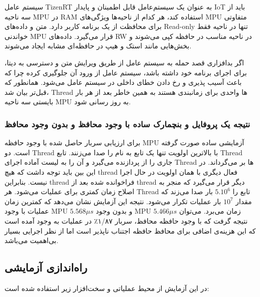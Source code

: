 \documentclass[10pt, a4paper]{article}
\begin{document}
سیستم عامل TizenRT به عنوان یک سیستم‌عامل قابل اطمینان و پایدار IoT باید از سه
ناحیه MPU در RAM استفاده کند، هر کدام از ناحیه‌ها ویژگی‌های MPU متفاوتی برای
محافظت از یک برنامه کاربر دارد. متن و داده‌های Read-only تنها در ناحیه فقط
خواندنی MPU قرار می‌گیرد. داده‌های RW در ناحیه مناسب در حافظه کپی می‌شوند و
بخش‌هایی مانند استک و هیپ در حافظه‌ای مشابه ایجاد می‌شوند.

اگر بد‌افزاری قصد حمله به سیستم عامل از طریق ویرایش متن و دسترسی به دیتا، برای
اجرای برنامه خود داشته باشد، سیستم عامل از ورود آن جلوگیری کرده چرا که باعث آسیب
پذیری و رخ دادن خطای داخلی در سیستم عامل  می‌شود.  همانطور که قبل‌تر بیان شد،
Thread ها واحدی برای زمانبندی هستند به همین خاطر بعد از هر بار  بایستی سه ناحیه MPU به روز رسانی شود.

\subsubsection{نتیجه یک پروفایل و بنچمارک ساده با وجود محافظ و بدون وجود محافظ}

برای ارزیابی سربار حاصل شده با وجود حافظه MPU آزمایشی ساده صورت گرفته است. دو
Thread با بالاترین اولویت تنها یک تابع به نام  را صدا
می‌زنند. تابع  Thread جاری را از پردازنده می‌گیرد و آن را به
لیست آماده اجرای Thread ها بر می‌گرداند. در این بین باید توجه داشت که هیچ thread
فعال دیگری با همان اولویت در حال اجرا نیست.  بنابراین thread فراخوانده شده بعد
از thread دیگر قرار می‌گیرد که منجر به اصلاح زمان کمتری برای عملیات  می‌شود. هر Thread تابع  را $5.10^6$ بار صدا می‌زند
که مقدار $10^7$ بار عملیات  تکرار می‌شود. نتیجه این آزمایش
نشان می‌دهد که کمترین زمان عملیات  با وجود MPU $5.568\mu s$ و
بدون وجود MPU $5.466\mu s$ زمان می‌برد. می‌توان نتیجه گرفت که با وجود حافظه محافظ،
سربار ۱/۸۷٪ در عملیات  به وجود آمده است که این هزینه‌ی
اضافی برای محافظ حافظه اجتناب ناپذیر است اما از نظر اجرایی بسیار بی‌اهمیت
می‌باشد.

\subsection{راه‌اندازی آزمایشی}

در این آزمایش از محیط عملیاتی و سخت‌افزار زیر استفاده شده است:
\end{document}
